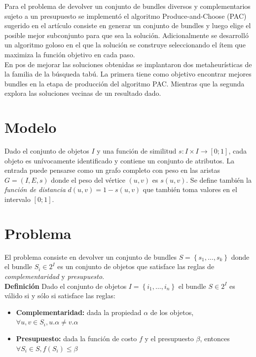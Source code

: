 Para el problema de devolver un conjunto de bundles diversos y complementarios sujeto a un presupuesto se implementó el algoritmo Produce-and-Choose (PAC) sugerido en el artículo \cite{compositeRetrival} consiste en generar un conjunto de bundles y luego elige el posible mejor subconjunto para que sea la solución. Adicionalmente se desarrolló un algoritmo goloso en el que la solución se construye seleccionando el ítem que maximiza la función objetivo en cada paso.\\
En pos de mejorar las soluciones obtenidas se implantaron dos metaheurísticas de la familia de la búsqueda tabú. La primera tiene como objetivo encontrar mejores bundles en la etapa de producción del algoritmo PAC. Mientras que la segunda explora las soluciones vecinas de un resultado dado.\\
\section{Modelo}
Dado el conjunto de objetos $I$ y una función de similitud $ s: I \times I \rightarrow [0;1]$, cada objeto es unívocamente identificado y contiene un conjunto de atributos. La entrada puede pensarse como un grafo completo con peso en las aristas $G=(I,E,s)$ donde el peso del vértice $(u,v)$ es $s(u,v)$. Se define también la \textit{función de distancia} $d(u,v) = 1 - s(u,v)$ que también toma valores en el intervalo $[0;1]$.

\section{Problema}
El problema consiste en devolver un conjunto de bundles $S = \left\{s_1, \ldots, s_k\right\}$ donde el bundle $S_i \in 2^{I}$ es un conjunto de objetos que satisface las reglas de \textit{complementaridad} y \textit{presupuesto}.\\
\textbf{Definición} Dado el conjunto de objetos $I=\left\{i_1,\ldots, i_n\right\}$ el bundle $S \in 2^{I}$ es válido si y sólo si satisface las reglas:
\begin{itemize}
	\item \textbf{Complementaridad:} dada la propiedad $\alpha$ de los objetos, $\forall u,v \in S_i, u.\alpha \neq v.\alpha$
	\item \textbf{Presupuesto:} dada la función de costo $f$ y el presupuesto $\beta$, entonces $\forall S_i \in S, f(S_i) \leq \beta$
\end{itemize}

